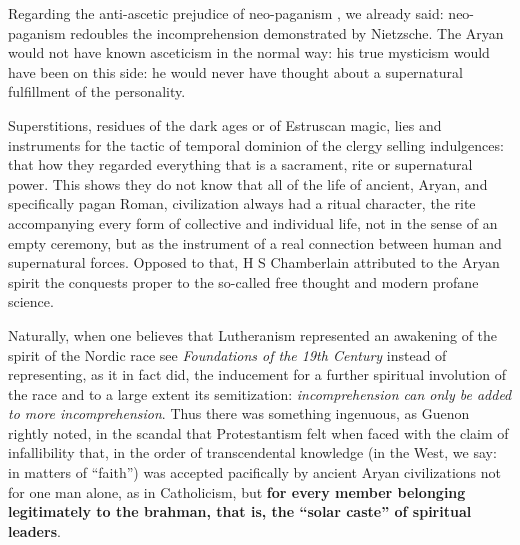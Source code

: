 \begin{quotationx}
Regarding the anti-ascetic prejudice of neo-paganism , we already said: neo-paganism redoubles the incomprehension demonstrated by Nietzsche. The Aryan would not have known asceticism in the normal way: his true mysticism would have been on this side: he would never have thought about a supernatural fulfillment of the personality.

Superstitions, residues of the dark ages or of Estruscan magic, lies and instruments for the tactic of temporal dominion of the clergy selling indulgences: that how they regarded everything that is a sacrament, rite or supernatural power. This shows they do not know that all of the life of ancient, Aryan, and specifically pagan Roman, civilization always had a ritual character, the rite accompanying every form of collective and individual life, not in the sense of an empty ceremony, but as the instrument of a real connection between human and supernatural forces. Opposed to that, H S Chamberlain attributed to the Aryan spirit the conquests proper to the so-called free thought and modern profane science.

Naturally, when one believes that Lutheranism represented an awakening of the spirit of the Nordic race see \emph{Foundations of the 19th Century} instead of representing, as it in fact did, the inducement for a further spiritual involution of the race and to a large extent its semitization: \emph{incomprehension can only be added to more incomprehension}. Thus there was something ingenuous, as Guenon rightly noted, in the scandal that Protestantism felt when faced with the claim of infallibility that, in the order of transcendental knowledge (in the West, we say: in matters of ``faith'') was accepted pacifically by ancient Aryan civilizations not for one man alone, as in Catholicism, but \textbf{for every member belonging legitimately to the brahman, that is, the ``solar caste'' of spiritual leaders}.
\end{quotationx}



